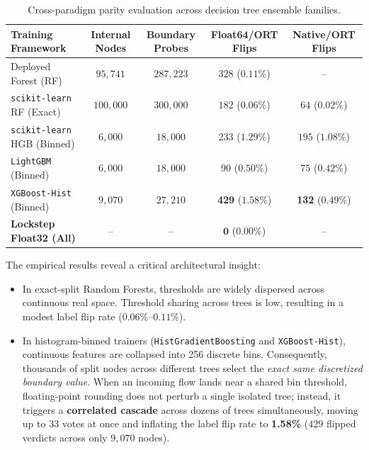 \begin{table}[t]
  \caption{Cross-paradigm parity evaluation across decision tree ensemble families.}
  \label{tab:cross_paradigm_parity}
  \centering
  \small
  \begin{tabular}{l c c c c}
    \toprule
    Training Framework & Internal Nodes & Boundary Probes & Float64/ORT Flips & Native/ORT Flips \\
    \midrule
    Deployed Forest (RF) & $95{,}741$ & $287{,}223$ & $328$ ($0.11\%$) & -- \\
    \texttt{scikit-learn} RF (Exact) & $100{,}000$ & $300{,}000$ & $182$ ($0.06\%$) & $64$ ($0.02\%$) \\
    \texttt{scikit-learn} HGB (Binned) & $6{,}000$ & $18{,}000$ & $233$ ($\mathbf{1.29\%}$) & $195$ ($\mathbf{1.08\%}$) \\
    \texttt{LightGBM} (Binned) & $6{,}000$ & $18{,}000$ & $90$ ($0.50\%$) & $75$ ($0.42\%$) \\
    \texttt{XGBoost-Hist} (Binned) & $9{,}070$ & $27{,}210$ & \textbf{429} ($\mathbf{1.58\%}$) & \textbf{132} ($0.49\%$) \\
    \midrule
    \textbf{Lockstep Float32 (All)} & -- & -- & $\mathbf{0}$ ($\mathbf{0.00\%}$) & -- \\
    \bottomrule
  \end{tabular}
\end{table}

The empirical results reveal a critical architectural insight:
\begin{itemize}
    \item In exact-split Random Forests, thresholds are widely dispersed across continuous real space. Threshold sharing across trees is low, resulting in a modest label flip rate ($0.06\%$--$0.11\%$).
    \item In histogram-binned trainers (\texttt{HistGradientBoosting} and \texttt{XGBoost-Hist}), continuous features are collapsed into 256 discrete bins. Consequently, thousands of split nodes across different trees select the \emph{exact same discretized boundary value}. When an incoming flow lands near a shared bin threshold, floating-point rounding does not perturb a single isolated tree; instead, it triggers a \textbf{correlated cascade} across dozens of trees simultaneously, moving up to 33 votes at once and inflating the label flip rate to \textbf{1.58\%} ($429$ flipped verdicts across only $9{,}070$ nodes).
\end{itemize}

